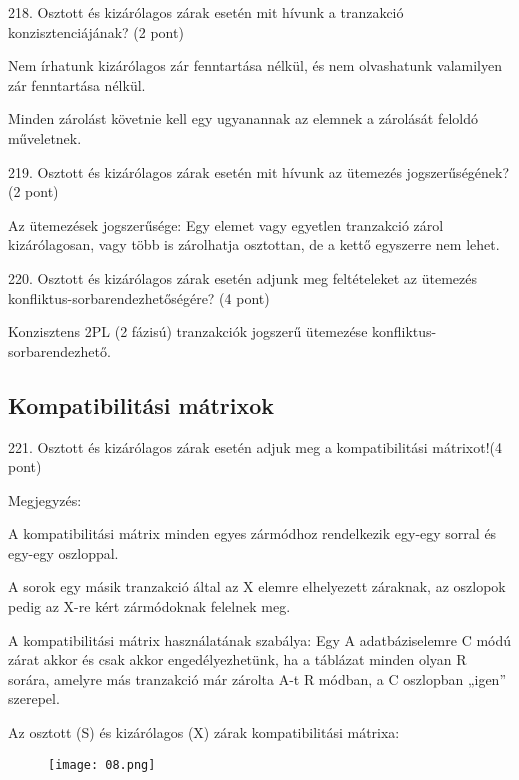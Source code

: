 \documentclass[a4paper,11.5pt, table]{article}
\begin{document}
218. Osztott és kizárólagos zárak esetén mit hívunk a tranzakció konzisztenciájának? (2 pont)
	\begin{compactitem}
		\item Nem írhatunk kizárólagos zár fenntartása nélkül, és nem olvashatunk valamilyen zár fenntartása nélkül. 
		\item Minden zárolást követnie kell egy ugyanannak az elemnek a zárolását feloldó műveletnek.
	\end{compactitem}

219. Osztott és kizárólagos zárak esetén mit hívunk az ütemezés jogszerűségének? (2 pont)
	\begin{compactitem}
		\item Az ütemezések jogszerűsége: Egy elemet vagy egyetlen tranzakció zárol kizárólagosan, vagy több is zárolhatja osztottan, de a kettő egyszerre nem lehet. 
	\end{compactitem}

220. Osztott és kizárólagos zárak esetén adjunk meg feltételeket az ütemezés konfliktus-sorbarendezhetőségére? (4 pont)
	\begin{compactitem}
		\item Konzisztens 2PL (2 fázisú) tranzakciók jogszerű ütemezése konfliktus-sorbarendezhető.
	\end{compactitem}

\subsection{Kompatibilitási mátrixok}

221. Osztott és kizárólagos zárak esetén adjuk meg a kompatibilitási mátrixot!(4 pont)
	\begin{compactitem}
		\item Megjegyzés:
		\begin{compactitem}
			\item A kompatibilitási mátrix minden egyes zármódhoz rendelkezik egy-egy sorral és egy-egy oszloppal. 
			\item A sorok egy másik tranzakció által az X elemre elhelyezett záraknak, az oszlopok pedig az X-re kért zármódoknak felelnek meg. 
			\item A kompatibilitási mátrix használatának szabálya:
			Egy A adatbáziselemre C módú zárat akkor és csak akkor engedélyezhetünk, ha a táblázat minden olyan R sorára, amelyre más tranzakció már zárolta A-t R módban, a C oszlopban „igen” szerepel.
		\end{compactitem}
		\item Az osztott (S) és kizárólagos (X) zárak kompatibilitási mátrixa:
		\begin{figure}[h]
			\centering
			\texttt{[image: 08.png]}
		\end{figure}
	\end{compactitem}
\end{document}

